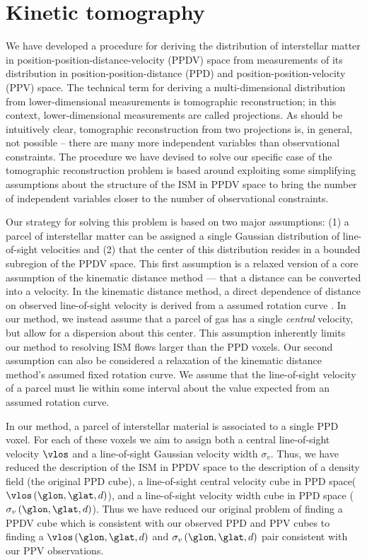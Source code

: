 \section{Kinetic tomography}
\label{sec:KT}

We have developed a procedure for deriving the distribution of interstellar matter in position-position-distance-velocity (PPDV) space from measurements of its distribution in position-position-distance (PPD) and position-position-velocity (PPV) space. The technical term for deriving a multi-dimensional distribution from lower-dimensional measurements is tomographic reconstruction; in this context, lower-dimensional measurements are called projections. As should be intuitively clear, tomographic reconstruction from two projections is, in general, not possible -- there are many more independent variables than observational constraints. The procedure we have devised to solve our specific case of the tomographic reconstruction problem is based around exploiting some simplifying assumptions about the structure of the ISM in PPDV space to bring the number of independent variables closer to the number of observational constraints. 

Our strategy for solving this problem is based on two major assumptions: (1) a parcel of interstellar matter can be assigned a single Gaussian distribution of line-of-sight velocities and (2) that the center of this distribution resides in a bounded subregion of the PPDV space. This first assumption is a relaxed version of a core assumption of the kinematic distance method --- that a distance can be converted into a velocity. In the kinematic distance method, a direct dependence of distance on observed line-of-sight velocity is derived from a assumed rotation curve \citep[e.g.][]{Levine_2006}. In our method, we instead assume that a parcel of gas has a single \emph{central} velocity, but allow for a dispersion about this center. This assumption inherently limits our method to resolving ISM flows larger than the PPD voxels. Our second assumption can also be considered a relaxation of the kinematic distance method's assumed fixed rotation curve. We assume that the line-of-sight velocity of a parcel must lie within some interval about the value expected from an assumed rotation curve. 

In our method, a parcel of interstellar material is associated to a single PPD voxel. For each of these voxels we aim to assign both a central line-of-sight velocity $\vlos$ and a line-of-sight Gaussian velocity width $\sigma_v$. Thus, we have reduced the description of the ISM in PPDV space to the description of a density field (the original PPD cube), a line-of-sight central velocity cube in PPD space($\vlos\left(\glon, \glat, d \right)$), and a line-of-sight velocity width cube in PPD space ($\sigma_v \left(\glon, \glat, d \right)$). Thus we have reduced our original problem of finding a PPDV cube which is consistent with our observed PPD and PPV cubes to finding a $\vlos\left(\glon, \glat, d \right)$ and $\sigma_v \left(\glon, \glat, d \right)$ pair consistent with our PPV observations. 

